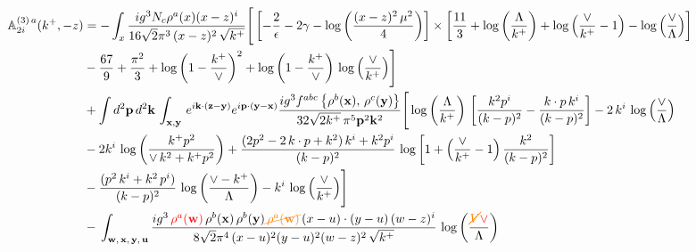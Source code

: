 \documentclass[aps,prd,amsmath,amssymb,nofootinbib]{revtex4-2}
\def\mf#1{\mathbb{#1}}
\def\v#1{\mathbf{#1}}
\numberwithin{equation}{section}
\begin{document}
\begin{align}
   \mf{A}^{(3)\,a}_{2i}(k^{+},-z)  & =  -\int_{x} \frac{ig^{3}N_{c}\rho^{a}(x)(x-z)^{i}}{16\sqrt{2}\pi^{3}\,(x-z)^{2}\,\sqrt{k^{+}}}\Bigg[\left[-\frac{2}{\epsilon}-2\gamma -\log{\left(\frac{(x-z)^{2}\,\mu^{2}}{4}\right)}\right]\times \left[\frac{11}{3}+ \log{\left(\frac{\Lambda}{k^{+}}\right)}+\log{\left(\frac{\vee}{k^{+}}-1\right)}-\log{\left(\frac{\vee}{\Lambda}\right)}\right]\notag \\ & -\frac{67}{9}+\frac{\pi^{2}}{3} + \log{\left(1-\frac{k^{+}}{\vee}\right)}^{2}+\log{\left(1-\frac{k^{+}}{\vee}\right)}\,\log{\left(\frac{\vee}{k^{+}}\right)}\Bigg] \notag \\ & +\int d^{2}\mathbf{p}\,d^{2}\mathbf{k}\,\int_{\v{x},\v{y}}\, e^{i\v{k}\cdot (\v{z}-\v{y})} e^{i\v{p}\cdot (\v{y}-\v{x})}\frac{ig^{3}f^{abc}\left\{ \rho^{b}(\mathbf{x}),\,\rho^{c}(\mathbf{y})\right\}}{32\sqrt{2k^{+}}\,\pi^{5}\mathbf{p}^{2}\mathbf{k}^{2}}\Bigg[\log{\left(\frac{\Lambda}{k^{+}}\right)}\,\left[\frac{k^{2}p^{i}}{(k-p)^{2}}-\frac{k\cdot p\,k^{i}}{(k-p)^{2}}\right]-2\,k^{i}\,\log{\left(\frac{\vee}{\Lambda}\right)}\notag \\ & -2k^{i}\,\log{\left(\frac{k^{+}p^{2}}{\vee\, k^{2}+k^{+}p^{2}}\right)}+\frac{(2p^{2}-2\,k\cdot p + k^{2})\,k^{i} + k^{2}p^{i}}{(k-p)^{2}}\, \log{\left[1+\left(\frac{\vee}{k^{+}}-1\right)\frac{k^{2}}{(k-p)^{2}}\right]}\notag \\ & - \frac{(p^{2}\,k^{i}+k^{2}\,p^{i})}{(k-p)^{2}}\, \log{\left(\frac{\vee - k^{+}}{\Lambda}\right)}-k^{i}\, \log{\left(\frac{\vee}{k^{+}}\right)}\Bigg]\notag \\ & -\,\int_{\mathbf{w},\, \mathbf{x},\, \mathbf{y},\, \mathbf{u}}\frac{ig^{3}\,{\color{red}\rho^{a}(\mathbf{w})}\,\rho^{b}(\mathbf{x})\,\rho^{b}(\mathbf{y}){\color{orange}\cancel{\,\rho^{a}(\mathbf{w})}}\, (x-u)\cdot (y-u)\,(w-z)^{i}}{8\sqrt{2}\pi^{4}\,(x-u)^{2}(y-u)^{2}(w-z)^{2}\,\sqrt{k^{+}}}\,\log{\left(\frac{{\color{orange}\cancel{V}}{\color{red}\vee}}{\Lambda}\right)} %
\end{align}
\end{document}
